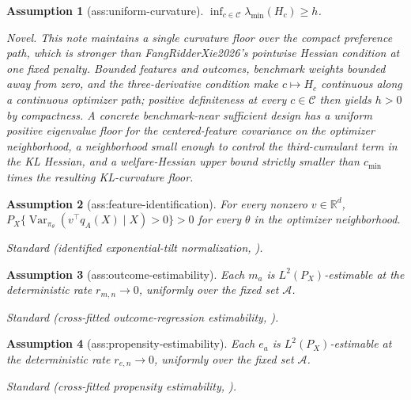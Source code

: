 \documentclass{article}
\newtheorem{assumption}{Assumption}
\begin{document}
\begin{assumption}[ass:uniform-curvature]\label{ass:uniform-curvature}
\(\inf_{c\in\mathcal C}\lambda_{\min}(H_c)\ge h\).
\par\smallskip\noindent\emph{Novel.} This note maintains a single curvature floor over the compact preference path, which is stronger than FangRidderXie2026's pointwise Hessian condition at one fixed penalty. Bounded features and outcomes, benchmark weights bounded away from zero, and the three-derivative condition make \(c\mapsto H_c\) continuous along a continuous optimizer path; positive definiteness at every \(c\in\mathcal C\) then yields \(h>0\) by compactness. A concrete benchmark-near sufficient design has a uniform positive eigenvalue floor for the centered-feature covariance on the optimizer neighborhood, a neighborhood small enough to control the third-cumulant term in the KL Hessian, and a welfare-Hessian upper bound strictly smaller than \(c_{\min}\) times the resulting KL-curvature floor.
\end{assumption}

\begin{assumption}[ass:feature-identification]\label{ass:feature-identification}
For every nonzero \(v\in\mathbb R^d\), \(P_X\{\operatorname{Var}_{\pi_\theta}(v^\top q_A(X)\mid X)>0\}>0\) for every \(\theta\) in the optimizer neighborhood.
\par\smallskip\noindent\emph{Standard} (identified exponential-tilt normalization, \cite{FangRidderXie2026}).
\end{assumption}

\begin{assumption}[ass:outcome-estimability]\label{ass:outcome-estimability}
Each \(m_a\) is \(L^2(P_X)\)-estimable at the deterministic rate \(r_{m,n}\to0\), uniformly over the fixed set \(\mathcal A\).
\par\smallskip\noindent\emph{Standard} (cross-fitted outcome-regression estimability, \cite{ChernozhukovEtAl2018DML}).
\end{assumption}

\begin{assumption}[ass:propensity-estimability]\label{ass:propensity-estimability}
Each \(e_a\) is \(L^2(P_X)\)-estimable at the deterministic rate \(r_{e,n}\to0\), uniformly over the fixed set \(\mathcal A\).
\par\smallskip\noindent\emph{Standard} (cross-fitted propensity estimability, \cite{ChernozhukovEtAl2018DML}).
\end{assumption}
\end{document}
